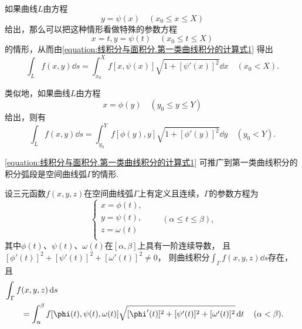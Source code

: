如果曲线\(L\)由方程\[
y = \psi(x)
\quad(x_0 \leq x \leq X)
\]给出，那么可以把这种情形看做特殊的参数方程\[
x = t,
y = \psi(t)
\quad(x_0 \leq t \leq X)
\]的情形，从而由\cref{equation:线积分与面积分.第一类曲线积分的计算式1} 得出
\begin{equation}
\int_L f(x,y) \dd{s}
= \int_{x_0}^X f[x,\psi(x)] \sqrt{1+[\psi'(x)]^2} \dd{x}
\quad(x_0 < X).
\end{equation}

类似地，如果曲线\(L\)由方程\[
x = \phi(y)
\quad(y_0 \leq y \leq Y)
\]给出，则有
\begin{equation}
\int_L f(x,y) \dd{s}
= \int_{y_0}^Y f[\phi(y),y] \sqrt{1+[\phi'(y)]^2} \dd{y}
\quad(y_0 < Y).
\end{equation}

\cref{equation:线积分与面积分.第一类曲线积分的计算式1} 可推广到第一类曲线积分的积分弧段是空间曲线弧\(\Gamma\)的情形.
\begin{theorem}
设三元函数\(f(x,y,z)\)在空间曲线弧\(\Gamma\)上有定义且连续，\(\Gamma\)的参数方程为\[
\left\{ \begin{array}{l}
x = \phi(t), \\
y = \psi(t), \\
z = \omega(t) \\
\end{array} \right.
\qquad
(\alpha \leq t \leq \beta),
\]其中\(\phi(t)\)、\(\psi(t)\)、\(\omega(t)\)在\([\alpha,\beta]\)上具有一阶连续导数，
且\([\phi'(t)]^2+[\psi'(t)]^2+[\omega'(t)]^2 \neq 0\)，
则曲线积分\(\int_\Gamma f(x,y,z) \dd{s}\)存在，
且\begin{equation}\label{equation:线积分与面积分.第一类曲线积分的计算式2}
\begin{aligned}
&\hspace{-20pt}
\int_\Gamma f(x,y,z) \dd{s} \\
&= \int_\alpha^\beta f[\phi(t),\psi(t),\omega(t)] \sqrt{[\phi'(t)]^2+[\psi'(t)]^2+[\omega'(t)]^2} \dd{t}
\quad(\alpha<\beta).
\end{aligned}
\end{equation}
\end{theorem}

